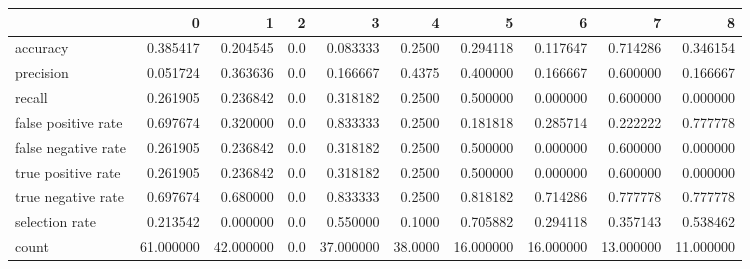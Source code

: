 \begin{tabular}{lrrrrrrrrr}
\toprule
{} &          0 &          1 &    2 &          3 &        4 &          5 &          6 &          7 &          8 \\
\midrule
accuracy            &   0.385417 &   0.204545 &  0.0 &   0.083333 &   0.2500 &   0.294118 &   0.117647 &   0.714286 &   0.346154 \\
precision           &   0.051724 &   0.363636 &  0.0 &   0.166667 &   0.4375 &   0.400000 &   0.166667 &   0.600000 &   0.166667 \\
recall              &   0.261905 &   0.236842 &  0.0 &   0.318182 &   0.2500 &   0.500000 &   0.000000 &   0.600000 &   0.000000 \\
false positive rate &   0.697674 &   0.320000 &  0.0 &   0.833333 &   0.2500 &   0.181818 &   0.285714 &   0.222222 &   0.777778 \\
false negative rate &   0.261905 &   0.236842 &  0.0 &   0.318182 &   0.2500 &   0.500000 &   0.000000 &   0.600000 &   0.000000 \\
true positive rate  &   0.261905 &   0.236842 &  0.0 &   0.318182 &   0.2500 &   0.500000 &   0.000000 &   0.600000 &   0.000000 \\
true negative rate  &   0.697674 &   0.680000 &  0.0 &   0.833333 &   0.2500 &   0.818182 &   0.714286 &   0.777778 &   0.777778 \\
selection rate      &   0.213542 &   0.000000 &  0.0 &   0.550000 &   0.1000 &   0.705882 &   0.294118 &   0.357143 &   0.538462 \\
count               &  61.000000 &  42.000000 &  0.0 &  37.000000 &  38.0000 &  16.000000 &  16.000000 &  13.000000 &  11.000000 \\
\bottomrule
\end{tabular}
